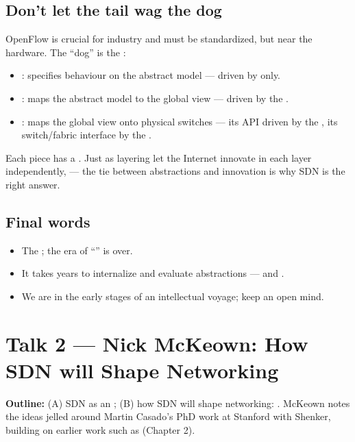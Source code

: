 \subsection{Don't let the tail wag the dog}
OpenFlow is crucial for industry and must be standardized, but  near the hardware. The ``dog'' is the :
\begin{itemize}
\item {}: specifies behaviour on the abstract model --- driven by  only.
\item {}: maps the abstract model to the global view --- driven by the .
\item {}: maps the global view onto physical switches --- its API driven by the , its switch/fabric interface by the .
\end{itemize}
Each piece has a . Just as layering let the Internet innovate in each layer independently,  --- the tie between abstractions and innovation is why SDN is the right answer.

\subsection{Final words}
\begin{itemize}
\item The ; the era of ``'' is over.
\item It takes years to internalize and evaluate abstractions --- and .
\item We are in the early stages of an intellectual voyage; keep an open mind.
\end{itemize}

\section{Talk 2 --- Nick McKeown: How SDN will Shape Networking}
\textbf{Outline:} (A) SDN as an ; (B) how SDN will shape networking: . McKeown notes the ideas jelled around Martin Casado's PhD work at Stanford with Shenker, building on earlier work such as  (Chapter 2).

